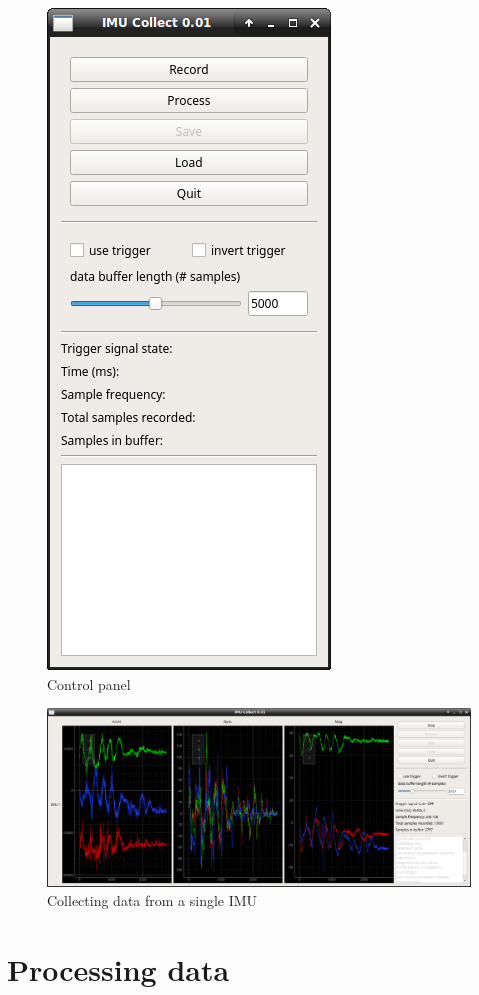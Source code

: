 \documentclass[11pt,letterpaper,article]{memoir}
\begin{document}
\begin{figure}[]
    \begin{center}
        \includegraphics[width=.45\textwidth]{screenshot_0_imu}
    \end{center}
    \caption{Control panel} 
\end{figure}

\begin{figure}[]
    \begin{center}
        \includegraphics[width=.45\textwidth]{screenshot_1_imu}
    \end{center}
    \caption{Collecting data from a single IMU} 
\end{figure}





\section{Processing data}
\end{document}
